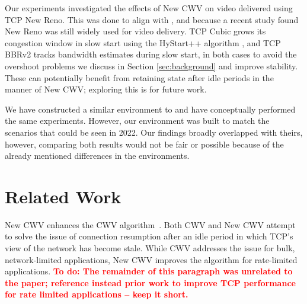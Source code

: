 \documentclass[10pt,sigconf]{acmart}
\newcommand{\todo}[1]{\textbf{\textcolor{red}{To do: #1}}}
\begin{document}
Our experiments investigated the effects of New CWV on video delivered
using TCP New Reno. This was done to align with
\cite{Nazir-2014-performance-evaluation-congestion-window-validation-dash-newcwv},
and because a recent study \cite{Mishra-2019-the-great-internet-tcp-congestion-control-census}
found New Reno was still widely used for video delivery.
%
TCP Cubic grows its congestion window in slow start using the HyStart++
algorithm \cite{draft-ietf-tcpm-hystartplusplus}, and TCP BBRv2 tracks
bandwidth estimates during slow start, in both cases to avoid the overshoot
problems we discuss in Section \ref{sec:background} and improve stability.
These can potentially benefit from retaining state after idle periods in
the manner of New CWV; exploring this is for future work.

We have constructed a similar environment to \cite{Nazir-2014-performance-evaluation-congestion-window-validation-dash-newcwv} and have conceptually performed the same experiments. However, our environment was built to match the scenarios that could be seen in 2022. Our findings broadly overlapped with theirs, however, comparing both results would not be fair or possible because of the already mentioned differences in the environments. 

\section{Related Work}
\label{sec:related}

New CWV enhances the CWV algorithm~\cite{rfc2861-2000-padhye-congestion-window-validation}.
Both CWV and New CWV attempt to solve the issue of connection resumption after
an idle period in which TCP's view of the network has become stale. While CWV
addresses the issue for bulk, network-limited applications, New CWV improves
the algorithm for rate-limited applications.
\todo{The remainder of this paragraph was unrelated to the paper; reference
instead prior work to improve TCP performance for rate limited applications --
keep it short.}
\end{document}
